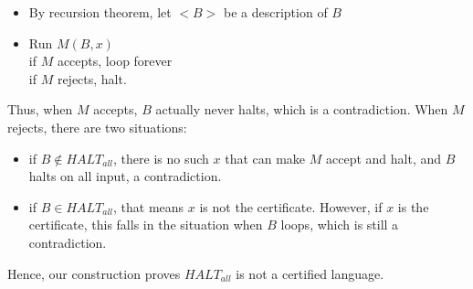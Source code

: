 \documentclass[12pt]{article}
\theoremstyle{definition}
\numberwithin{equation}{section}
\begin{document}
\begin{itemize}
\item By recursion theorem, let $<B>$ be a description of $B$ 
\item Run $M(B,x)$ \\
if $M$ accepts, loop forever \\
if $M$ rejects, halt.
\end{itemize}
Thus, when $M$ accepts, $B$ actually never halts, which is a contradiction. When $M$ rejects, there are two situations: \\
 \begin{itemize}
\item if $B \not \in HALT_{all}$, there is no such $x$ that can make $M$ accept and halt, and $B$ halts on all input, a contradiction.
\item if $B \in HALT_{all}$, that means $x$ is not the certificate. However, if $x$ is the certificate, this falls in the situation when $B$ loops, which is still a contradiction.
\end{itemize}
Hence, our construction proves $HALT_{all}$ is not a certified language.
\end{document}
